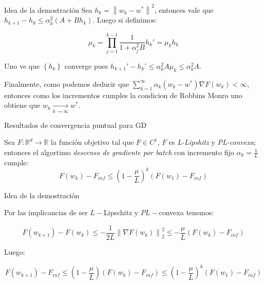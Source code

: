 \documentclass{beamer}
\newcommand{\R}{{\mathbb{R}}}
\newcommand{\norm}[1]{\left\lVert#1\right\rVert}
\newcommand{\sett}[1]{\left\lbrace#1\right\rbrace}
\newcommand{\underlimitinf}[1]{\xrightarrow[#1 \rightarrow \infty]{}}
\begin{document}
\begin{frame}{Idea de la demostraci\'on}
Sea $h_k = \norm{w_k - w^*}^2$, entonces vale que $h_{k+1} - h_k \leq \alpha_k^2 \left(A + B h_k\right)$. Luego si definimos:

\begin{subequations}
	\begin{equation*}
	\mu_k = \prod\limits_{j=1}^{k-1} {\dfrac{1}{1 + \alpha_j^2B}}
	\end{equation*}
	\begin{equation*}
	h_k' = \mu_k h_k
	\end{equation*}
\end{subequations}

Uno ve que $\sett{h_k}$ converge pues $h_{k+1}' - h_{k}' \leq \alpha_k^2 A \mu_k \leq \alpha_k^2 A$. 

\pause
\smallskip

Finalmente, como podemos deducir que $\sum\limits_{k=1}^{\infty} {\alpha_k \left(w_k - w^* \right)\nabla F(w_k)} < \infty$, entonces como los incrementos cumples la condicion de Robbins Monro uno obtiene que $w_k \underlimitinf{k} w^*$.

\end{frame}

\begin{frame}{Resultados de convergencia puntual para GD}

\begin{theorem}
	Sea $F: \R^d \rightarrow \R$ la funci\'on objetivo tal que $F \in C^1$, $F$ es \textit{L-Lipshitz} y \textit{PL-convexa}; entonces el algortimo \textit{descenso de gradiente por batch} con incremento fijo $\alpha_k = \frac{1}{L}$ cumple:
	\begin{equation*}
	F(w_k) - F_{inf} \leq \left(1 - \frac{\mu}{L}\right)^k \left(F(w_1) - F_{inf}\right)
	\end{equation*}
\end{theorem}

\end{frame}

\begin{frame}{Idea de la demostraci\'on}

Por las implicancias de ser $L-$Lipschitz y $PL-$convexa tenemos:

\begin{equation*}
F(w_{k+1}) - F(w_k) \leq -\frac{1}{2L} \norm{\nabla F(w_k)}_2^2 \leq - \frac{\mu}{L} \left(F(w_k) - F_{inf}\right)
\end{equation*}

Luego:

\begin{equation*}
F(w_{k+1}) - F_{inf} \leq \left(1 - \frac{\mu}{L} \right) \left(F(w_k) - F_{inf}\right) \leq \left(1 - \frac{\mu}{L}\right)^k \left(F(w_1) - F_{inf}\right)
\end{equation*}

\end{frame}
\end{document}
